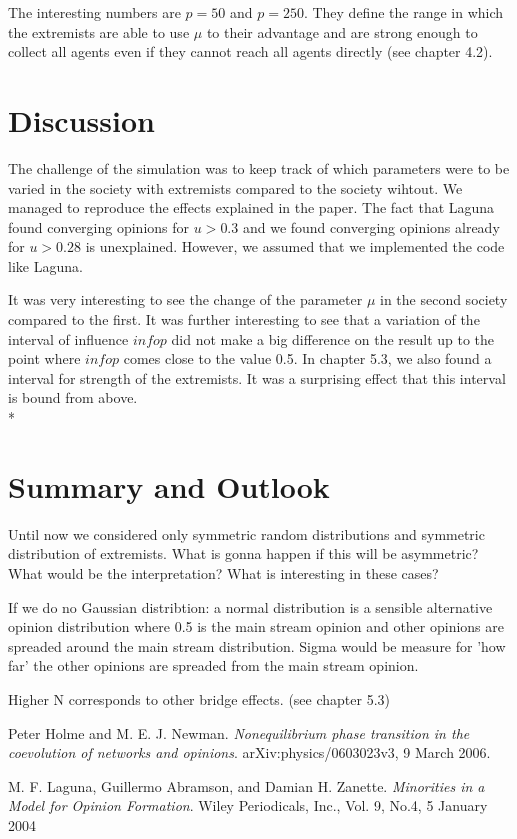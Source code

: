 \documentclass[11pt]{article}
\begin{document}
The interesting numbers are $p = 50$ and $p = 250$. They define the range in which the extremists are able to use $\mu$ to their advantage and are strong enough to collect all agents even if they cannot reach all agents directly (see chapter 4.2).


\section{Discussion}
The challenge of the simulation was to keep track of which parameters were to be varied in the society with extremists compared to the society wihtout. We managed to reproduce the effects explained in the paper. The fact that Laguna found converging opinions for $u>0.3$ and we found converging opinions already for $u>0.28$ is unexplained. However, we assumed that we implemented the code like Laguna.

It was very interesting to see the change of the parameter $\mu$ in the second society compared to the first. It was further interesting to see that a variation of the interval of influence $infop$ did not make a big difference on the result up to the point where $infop$ comes close to the value 0.5. In chapter 5.3, we also found a interval for strength of the extremists. It was a surprising effect that this interval is bound from above. \\*


\section{Summary and Outlook}
Until now we considered only symmetric random distributions and symmetric distribution of extremists. What is gonna happen if this will be asymmetric? What would be the interpretation? What is interesting in these cases?


If we do no Gaussian distribtion: a normal distribution is a sensible alternative opinion distribution where 0.5 is the main stream opinion and other opinions are spreaded around the main stream distribution. Sigma would be measure for 'how far' the other opinions are spreaded from the main stream opinion.

Higher N corresponds to other bridge effects. (see chapter 5.3)


\begin{thebibliography}{99}
 Peter Holme and M. E. J. Newman. \textit{Nonequilibrium phase transition in the coevolution of networks and opinions}. arXiv:physics/0603023v3, 9 March 2006.

 M. F. Laguna, Guillermo Abramson, and Damian H. Zanette. \textit{Minorities in a Model for Opinion Formation}. Wiley Periodicals, Inc., Vol. 9, No.4, 5 January 2004

\end{thebibliography} 
\end{document}
